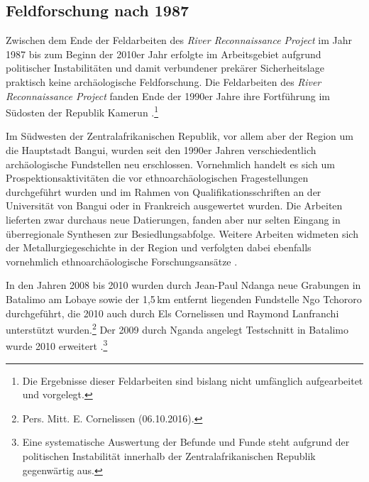 \subsection*{Feldforschung nach 1987}

Zwischen dem Ende der Feldarbeiten des \textit{River Reconnaissance Project} im Jahr 1987 bis zum Beginn der 2010er Jahr erfolgte im Arbeitsgebiet aufgrund politischer Instabilitäten und damit verbundener prekärer Sicherheitslage praktisch keine archäologische Feldforschung. Die Feldarbeiten des \textit{River Reconnaissance Project} fanden Ende der 1990er Jahre ihre Fortführung im Südosten der Republik Kamerun \parencite{Eggert.2002}.\footnote{Die Ergebnisse dieser Feldarbeiten sind bislang nicht umfänglich aufgearbeitet und vorgelegt.}

Im Südwesten der Zentralafrikanischen Republik, vor allem aber der Region um die Hauptstadt Bangui, wurden seit den 1990er Jahren verschiedentlich archäologische Fundstellen neu erschlossen. Vornehmlich handelt es sich um Prospektionsaktivitäten die vor ethnoarchäologischen Fragestellungen durchgeführt wurden und im Rahmen von Qualifikationsschriften an der Universität von Bangui \parencites{Ndanga.199596}{Abrou.199697} oder in Frankreich \parencites{Kote.1992}{Scouflaire.1997} ausgewertet wurden. Die Arbeiten lieferten zwar durchaus neue Datierungen, fanden aber nur selten Eingang in überregionale Synthesen zur Besiedlungsabfolge. Weitere Arbeiten widmeten sich der Metallurgiegeschichte in der Region und verfolgten dabei ebenfalls vornehmlich ethnoarchäologische Forschungsansätze \parencites{Muramira.20042005}{Muramira.20052006}{Moga.2008}. 

In den Jahren 2008 bis 2010 wurden durch Jean-Paul Ndanga neue Grabungen in Batalimo am Lobaye sowie der 1,5\,km entfernt liegenden Fundstelle Ngo Tchororo durchgeführt, die 2010 auch durch Els Cornelissen und Raymond Lanfranchi unterstützt wurden.\footnote{Pers. Mitt. E. Cornelissen (06.10.2016).} Der 2009 durch Nganda angelegt Testschnitt in Batalimo wurde 2010 erweitert \parencite[siehe Kap.~\ref{sec:BTM-Gr}]{Ndanga.2010}.\footnote{Eine systematische Auswertung der Befunde und Funde steht aufgrund der politischen Instabilität innerhalb der Zentralafrikanischen Republik gegenwärtig aus.}

